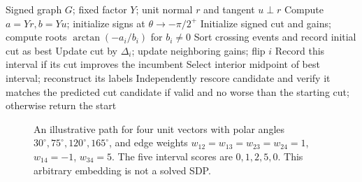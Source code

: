 \documentclass[10pt,letterpaper]{article}
\begin{document}
\begin{algorithm}[t]
\caption{Exact signed sweep on a specified great semicircle}
\label{alg:arc}
\begin{algorithmic}[1]
\Require Signed graph \(G\); fixed factor \(Y\); unit normal \(r\) and tangent \(u\perp r\)
\State Compute \(a=Yr,b=Yu\); initialize signs at \(\theta\to-\pi/2^+\)
\State Initialize signed cut and gains; compute roots \(\arctan(-a_i/b_i)\) for \(b_i\ne0\)
\State Sort crossing events and record initial cut as best
   \State Update cut by \(\Delta_i\); update neighboring gains; flip \(i\)
 \EndFor
 \State Record this interval if its cut improves the incumbent
\EndFor
\State Select interior midpoint of best interval; reconstruct its labels
\State Independently rescore candidate and verify it matches the predicted cut
\State \Return candidate if valid and no worse than the starting cut; otherwise return the start
\end{algorithmic}
\end{algorithm}

\begin{figure}[t]
\centering
{}
\caption{An illustrative path for four unit vectors with polar angles \(30^\circ,75^\circ,120^\circ,165^\circ\), and edge weights \(w_{12}=w_{13}=w_{23}=w_{24}=1\), \(w_{14}=-1\), \(w_{34}=5\). The five interval scores are \(0,1,2,5,0\). This arbitrary embedding is not a solved SDP.}
\label{fig:toy}
\end{figure}
\end{document}
